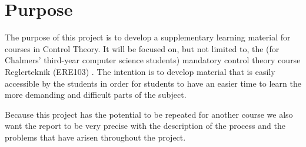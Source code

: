 \section{Purpose}\label{sec:purpose} 
The purpose of this project is to develop a supplementary learning material for courses in Control Theory. It will be focused on, but not limited to, the (for Chalmers' third-year computer science students) mandatory control theory course Reglerteknik (ERE103) \cite{ERE103}.  The intention is to develop material that is easily accessible by the students in order for students to have an easier time to learn the more demanding and difficult parts of the subject. 

Because this project has the potential to be repeated for another course we also want the report to be very precise with the description of the process and the problems that have arisen throughout the project.

\iffalse
Syfte
Specificerar vad rapporten är tänkt att resultera i och vilken typ av resultat som kommer att uppnås. 
Lämpligt att ha ett generellt syfte, kanske några få specificerade delsyften. 
I problemanalysen bryts syftet ner i mer detaljerade delsyften.
\fi